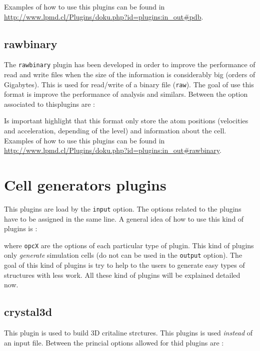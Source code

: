 Examples of how to use this plugins can be found in
\url{http://www.lpmd.cl/Plugins/doku.php?id=plugins:in_out#pdb}.

\subsection{rawbinary}

The \verb|rawbinary| plugin has been developed in order to improve the
performance of read and write files when the size of the information is
considerably big (orders of Gigabytes). This is used for read/write of a binary
file (\verb|raw|). The goal of use this format is improve the performance of
analysis and similars. Between the option associated to thisplugins are :


Is important highlight that this format only store the atom positions
(velocities and acceleration, depending of the level) and information about the
cell. Examples of how to use this plugins can be found in
\url{http://www.lpmd.cl/Plugins/doku.php?id=plugins:in_out#rawbinary}.

\section{Cell generators plugins}
\label{chap:modulos:generadores}

This plugins are load by the \verb|input| option. The options related to the
plugins have to be assigned in the same line. A general idea of how to use this
kind of plugins is :


\noindent
where \verb|opcX| are the options of each particular type of plugin. This kind
of plugins only \textit{generate} simulation cells (do not can be used in the
\verb|output| option). The goal of this kind of plugins is try to help to the
users to generate easy types of structures with less work. All these kind of
plugins will be explained detailed now.

\subsection{crystal3d}
This plugin is used to build 3D critaline strctures. This plugins is used
\textit{instead} of an input file. Between the princial options allowed for
thid plugins are :

